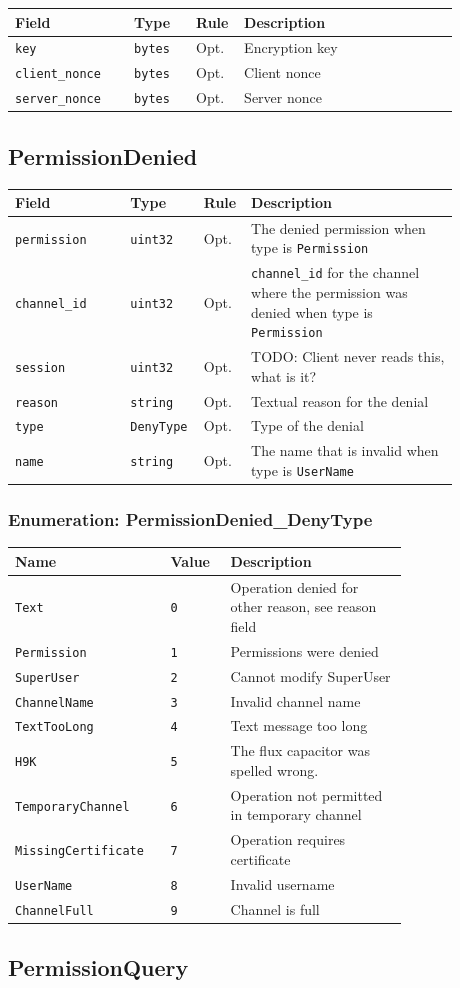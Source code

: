 \documentclass[11pt]{article} %
\newenvironment{mumbleMessageEx}
{%
	\small
	\renewcommand\arraystretch{1.5}
	\begin{tabular}{p{0.25\linewidth}p{0.13\linewidth}p{0.05\linewidth}p{0.45\linewidth}}
	Field & Type & Rule & Description \\
	\hline
}
{%
	\end{tabular}
	\renewcommand\arraystretch{1.0}
}
\newcommand{\mumbleMessageExItem}[4]{ \texttt{#1} & \texttt{#2} & #3 & #4 \\ }
\newenvironment{mumbleEnum}
{%
	\small
	\renewcommand\arraystretch{1.5}
	\begin{tabular}{p{0.25\linewidth}p{0.13\linewidth}p{0.4\linewidth}}
	Name & Value & Description \\
	\hline
}
{%
	\end{tabular}
	\renewcommand\arraystretch{1.0}
}
\newcommand{\mumbleEnumItem}[3]{ \texttt{#1} & \texttt{#2} & #3 \\ }
\begin{document}
\begin{mumbleMessageEx}
\mumbleMessageExItem{key}{bytes}{Opt.}{Encryption key}
\mumbleMessageExItem{client\_nonce}{bytes}{Opt.}{Client nonce}
\mumbleMessageExItem{server\_nonce}{bytes}{Opt.}{Server nonce}
\end{mumbleMessageEx}

\subsection{PermissionDenied}
\label{msg:permissionDenied}

\begin{mumbleMessageEx}
\mumbleMessageExItem{permission}{uint32}{Opt.}{The denied permission when type is \texttt{Permission}}
\mumbleMessageExItem{channel\_id}{uint32}{Opt.}{\texttt{channel\_id} for the channel where the permission was denied when type is \texttt{Permission}}
\mumbleMessageExItem{session}{uint32}{Opt.}{TODO: Client never reads this, what is it?}
\mumbleMessageExItem{reason}{string}{Opt.}{Textual reason for the denial}
\mumbleMessageExItem{type}{DenyType}{Opt.}{Type of the denial}
\mumbleMessageExItem{name}{string}{Opt.}{The name that is invalid when type is \texttt{UserName}}
\end{mumbleMessageEx}

\subsubsection{Enumeration: PermissionDenied\_DenyType}
\label{msg:permissionDenied:denyType}

\begin{mumbleEnum}
\mumbleEnumItem{Text}{0}{Operation denied for other reason, see reason field}
\mumbleEnumItem{Permission}{1}{Permissions were denied}
\mumbleEnumItem{SuperUser}{2}{Cannot modify SuperUser}
\mumbleEnumItem{ChannelName}{3}{Invalid channel name}
\mumbleEnumItem{TextTooLong}{4}{Text message too long}
\mumbleEnumItem{H9K}{5}{The flux capacitor was spelled wrong.}
\mumbleEnumItem{TemporaryChannel}{6}{Operation not permitted in temporary channel}
\mumbleEnumItem{MissingCertificate}{7}{Operation requires certificate}
\mumbleEnumItem{UserName}{8}{Invalid username}
\mumbleEnumItem{ChannelFull}{9}{Channel is full}
\end{mumbleEnum}

\subsection{PermissionQuery}
\label{msg:permissionQuery}
\end{document}
